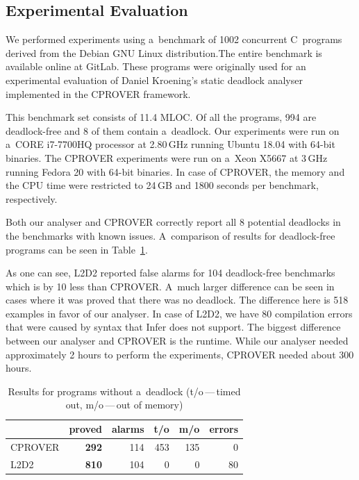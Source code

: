 \documentclass{ExcelAtFIT}
\begin{document}
\subsection{Experimental Evaluation}
We performed experiments using a~benchmark of 1002 concurrent C~programs derived from the Debian GNU Linux distribution.The entire benchmark is available online at GitLab. These programs were originally used for an experimental evaluation of Daniel Kroening's static deadlock analyser~\cite{cprover} implemented in the CPROVER framework.

This benchmark set consists of 11.4 MLOC. Of all the programs, 994 are deadlock-free and 8 of them contain a~deadlock. Our experiments were run on a~CORE i7-7700HQ processor at 2.80\,GHz running Ubuntu 18.04 with 64-bit binaries. The CPROVER experiments were run on a~Xeon X5667 at 3\,GHz running Fedora 20 with 64-bit binaries. In case of CPROVER, the memory and the CPU time were restricted to 24\,GB and 1800 seconds per benchmark, respectively.

Both our analyser and CPROVER correctly report all 8 potential deadlocks in the benchmarks with known issues. A~comparison of results for deadlock-free programs can be seen in Table~\ref{tbl:DeadlockBanch}.

As one can see, L2D2 reported false alarms for 104 deadlock-free benchmarks which is by 10 less than CPROVER. A~much larger difference can be seen in cases where it was proved that there was no deadlock. The difference here is 518 examples in favor of our analyser. In case of L2D2, we have 80 compilation errors that were caused by syntax that Infer does not support. The biggest difference between our analyser and CPROVER is the runtime. While our analyser needed approximately 2 hours to perform the experiments, CPROVER needed about 300 hours.
\begin{table}[t]
\caption{Results for programs without a~deadlock (t/o\,---\,timed out, m/o\,---\,out of memory)}
\begin{tabular}{l|r|r|r|r|r}
        & \multicolumn{1}{l|}{\textbf{proved}} & \multicolumn{1}{l|}{alarms} & \multicolumn{1}{l|}{t/o} & \multicolumn{1}{l|}{m/o} & \multicolumn{1}{l}{errors} \\ \hline
CPROVER & \textbf{292}                        & 114                        & 453                     & 135                     & 0                          \\
L2D2    & \textbf{810}                        & 104                        & 0                       & 0                       & 80
\end{tabular}
\label{tbl:DeadlockBanch}
\vspace{-5mm}
\end{table}
\end{document}
